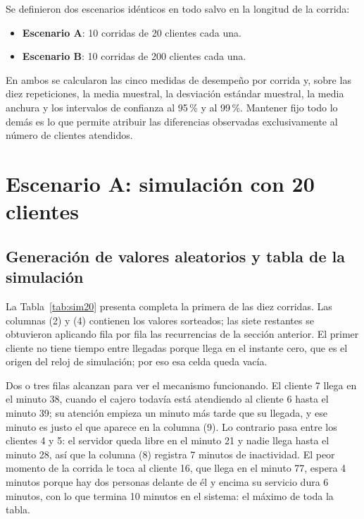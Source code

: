 \documentclass[11pt,letterpaper]{article}
\begin{document}
Se definieron dos escenarios idénticos en todo salvo en la longitud de la corrida:

\begin{itemize}[itemsep=2pt]
    \item \textbf{Escenario A}: 10 corridas de 20 clientes cada una.
    \item \textbf{Escenario B}: 10 corridas de 200 clientes cada una.
\end{itemize}

En ambos se calcularon las cinco medidas de desempeño por corrida y, sobre las diez repeticiones, la media muestral, la desviación estándar muestral, la media anchura y los intervalos de confianza al 95\,\% y al 99\,\%. Mantener fijo todo lo demás es lo que permite atribuir las diferencias observadas exclusivamente al número de clientes atendidos.

\section{Escenario A: simulación con 20 clientes}

\subsection{Generación de valores aleatorios y tabla de la simulación}

La Tabla~\ref{tab:sim20} presenta completa la primera de las diez corridas. Las columnas (2) y (4) contienen los valores sorteados; las siete restantes se obtuvieron aplicando fila por fila las recurrencias de la sección anterior. El primer cliente no tiene tiempo entre llegadas porque llega en el instante cero, que es el origen del reloj de simulación; por eso esa celda queda vacía.



Dos o tres filas alcanzan para ver el mecanismo funcionando. El cliente 7 llega en el minuto 38, cuando el cajero todavía está atendiendo al cliente 6 hasta el minuto 39; su atención empieza un minuto más tarde que su llegada, y ese minuto es justo el que aparece en la columna (9). Lo contrario pasa entre los clientes 4 y 5: el servidor queda libre en el minuto 21 y nadie llega hasta el minuto 28, así que la columna (8) registra 7 minutos de inactividad. El peor momento de la corrida le toca al cliente 16, que llega en el minuto 77, espera 4 minutos porque hay dos personas delante de él y encima su servicio dura 6 minutos, con lo que termina 10 minutos en el sistema: el máximo de toda la tabla.
\end{document}
